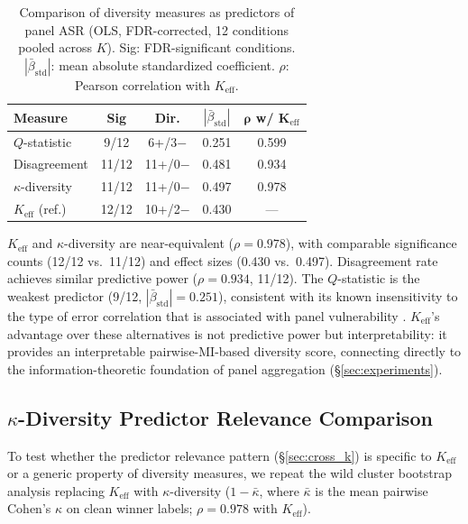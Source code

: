 \begin{table}[h]
\centering
\small
\caption{Comparison of diversity measures as predictors of panel ASR (OLS, FDR-corrected, 12 conditions pooled across $K$). Sig: FDR-significant conditions. $|\bar{\beta}_{\mathrm{std}}|$: mean absolute standardized coefficient. $\rho$: Pearson correlation with $K_{\mathrm{eff}}$.}
\label{tab:alt_diversity}
\begin{tabular}{lcccc}
\toprule
\textbf{Measure} & \textbf{Sig} & \textbf{Dir.} & \textbf{$|\bar{\beta}_{\mathrm{std}}|$} & $\boldsymbol{\rho}$ \textbf{w/} $\boldsymbol{K_{\mathrm{eff}}}$ \\
\midrule
$Q$-statistic    & 9/12  & 6+/3$-$ & 0.251 & 0.599 \\
Disagreement     & 11/12 & 11+/0$-$ & 0.481 & 0.934 \\
$\kappa$-diversity & 11/12 & 11+/0$-$ & 0.497 & 0.978 \\
\addlinespace
$K_{\mathrm{eff}}$ (ref.) & 12/12 & 10+/2$-$ & 0.430 & --- \\
\bottomrule
\end{tabular}
\end{table}

$K_{\mathrm{eff}}$ and $\kappa$-diversity \citep{kuncheva2003measures} are near-equivalent ($\rho{=}0.978$), with comparable significance counts (12/12 vs.\ 11/12) and effect sizes (0.430 vs.\ 0.497). Disagreement rate achieves similar predictive power ($\rho{=}0.934$, 11/12). The $Q$-statistic is the weakest predictor (9/12, $|\bar{\beta}_{\mathrm{std}}|{=}0.251$), consistent with its known insensitivity to the type of error correlation that is associated with panel vulnerability \citep{kuncheva2003measures}. $K_{\mathrm{eff}}$'s advantage over these alternatives is not predictive power but interpretability: it provides an interpretable pairwise-MI-based diversity score, connecting directly to the information-theoretic foundation of panel aggregation (\S\ref{sec:experiments}).

\subsection{$\kappa$-Diversity Predictor Relevance Comparison}
\label{app:kappa_regime}

To test whether the predictor relevance pattern (\S\ref{sec:cross_k}) is specific to $K_{\mathrm{eff}}$ or a generic property of diversity measures, we repeat the wild cluster bootstrap analysis replacing $K_{\mathrm{eff}}$ with $\kappa$-diversity ($1 - \bar{\kappa}$, where $\bar{\kappa}$ is the mean pairwise Cohen's $\kappa$ on clean winner labels; $\rho{=}0.978$ with $K_{\mathrm{eff}}$).

